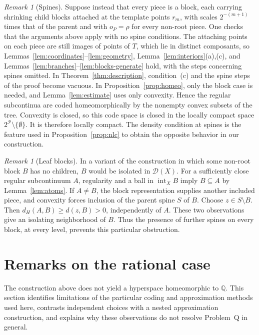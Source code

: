 \documentclass[11pt]{amsart}
\theoremstyle{definition}
\theoremstyle{remark}
\newtheorem{remark}[theorem]{Remark}
\newcommand{\intX}{\operatorname{int}_X}
\newcommand{\D}{\mathcal{D}}
\newcommand{\Pc}{\mathcal{P}}
\newcommand{\Q}{\mathbb{Q}}
\newcommand{\dH}{d_H}
\begin{document}
\begin{remark}[Spines]\label{rem:spines}
Suppose instead that every piece is a block, each carrying shrinking child blocks attached at the template points $r_m$, with scales $2^{-(m+1)}$ times that of the parent and with $o_P=\rho$ for every non-root piece. One checks that the arguments above apply with no spine conditions. The attaching points on each piece are still images of points of $T$, which lie in distinct composants, so Lemmas~\ref{lem:coordinates}--\ref{lem:geometry}, Lemma~\ref{lem:interiors}(a),(c), and Lemmas~\ref{lem:branches}--\ref{lem:blocks-generate} hold, with the steps concerning spines omitted. In Theorem~\ref{thm:description}, condition~(c) and the spine steps of the proof become vacuous. In Proposition~\ref{prop:homeo}, only the block case is needed, and Lemma~\ref{lem:estimate} uses only convexity. Hence the regular subcontinua are coded homeomorphically by the nonempty convex subsets of the tree. Convexity is closed, so this code space is closed in the locally compact space $2^\Pc\setminus\{\emptyset\}$. It is therefore locally compact. The density condition at spines is the feature used in Proposition~\ref{prop:nlc} to obtain the opposite behavior in our construction.
\end{remark}

\begin{remark}[Leaf blocks]\label{rem:leaf}
In a variant of the construction in which some non-root block $B$ has no children, $B$ would be isolated in $\D(X)$. For a sufficiently close regular subcontinuum $A$, regularity and a ball in $\intX B$ imply $B\subseteq A$ by Lemma~\ref{lem:atoms}. If $A\neq B$, the block representation supplies another included piece, and convexity forces inclusion of the parent spine $S$ of $B$. Choose $z\in S\setminus B$. Then $\dH(A,B)\ge d(z,B)>0$, independently of $A$. These two observations give an isolating neighborhood of $B$. Thus the presence of further spines on every block, at every level, prevents this particular obstruction.
\end{remark}

\section{Remarks on the rational case}\label{sec:rationals}

The construction above does not yield a hyperspace homeomorphic to $\Q$. This section identifies limitations of the particular coding and approximation methods used here, contrasts independent choices with a nested approximation construction, and explains why these observations do not resolve Problem~Q in general.
\end{document}
